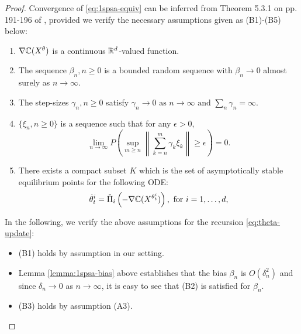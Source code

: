 \begin{proof}
Convergence of \eqref{eq:1spsa-equiv} can be inferred from Theorem 5.3.1 on pp. 191-196 of \cite{kushner-clark}, provided we verify the necessary assumptions given as (B1)-(B5) below:
\begin{enumerate}[\bfseries (B1)]
\item $\nabla \mathbb{C}(X^{\theta})$ is a continuous $\mathbb{R}^{d}$-valued function.
\item  The sequence $\beta_n,n\geq 0$ is a bounded random sequence with
$\beta_n \rightarrow 0$ almost surely as $n\rightarrow \infty$.
\item The step-sizes $\gamma_n,n\geq 0$ satisfy
$  \gamma_n\rightarrow 0 \mbox{ as }n\rightarrow\infty \text{ and } \sum_n \gamma_n=\infty.$
\item $\{\xi_n, n\ge 0\}$ is a sequence such that for any $\epsilon>0$,
\[ \lim_{n\rightarrow\infty} P\left( \sup_{m\geq n}  \left\|
\sum_{k=n}^{m} \gamma_k \xi_k\right\| \geq \epsilon \right) = 0. \]
\item There exists a compact subset $K$ which is the set of asymptotically stable equilibrium points for the following ODE:
\begin{align}
\dot\theta^{i}_t = \check\Pi_{i}\left(- \nabla \mathbb{C}(X^{\theta^{i}_t})\right), \text{ for } i=1,\dots,d,\label{eq:pi-ode}
\end{align}
\end{enumerate} 

In the following, we verify the above assumptions for the recursion \eqref{eq:theta-update}:
\begin{itemize}
\item (B1) holds by assumption in our setting.

\item Lemma \ref{lemma:1spsa-bias} above establishes that the bias $\beta_n$ is $O(\delta_n^2)$ and since $\delta_n \rightarrow 0$ as $n\rightarrow \infty$, it is easy to see that (B2) is satisfied for $\beta_n$. 

\item (B3) holds by assumption (A3).


\end{itemize}
\end{proof}
